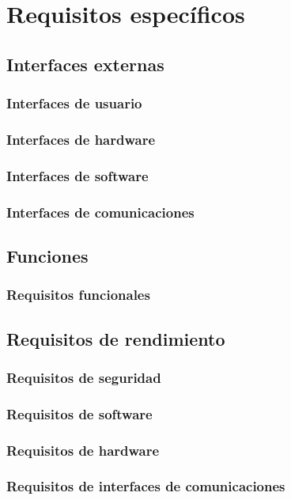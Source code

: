 \section{Requisitos específicos}
\subsection{Interfaces externas}
\subsubsection{Interfaces de usuario}
\subsubsection{Interfaces de hardware}
\subsubsection{Interfaces de software}
\subsubsection{Interfaces de comunicaciones}
\subsection{Funciones}
\subsubsection{Requisitos funcionales}


\subsection{Requisitos de rendimiento}
\subsubsection{Requisitos de seguridad}
\subsubsection{Requisitos de software}
\subsubsection{Requisitos de hardware}
\subsubsection{Requisitos de interfaces de comunicaciones}
